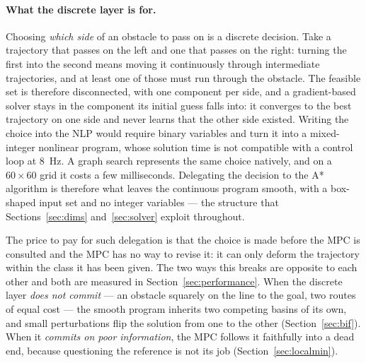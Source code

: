 \documentclass[11pt,a4paper]{article}
\begin{document}
\paragraph{What the discrete layer is for.} Choosing \emph{which side} of an obstacle to pass on is a discrete decision. Take a trajectory that passes on the left and one that passes on the right: turning the first into the second means moving it continuously through intermediate trajectories, and at least one of those must run through the obstacle. The feasible set is therefore disconnected, with one component per side, and a gradient-based solver stays in the component its initial guess falls into: it converges to the best trajectory on one side and never learns that the other side existed. Writing the choice into the NLP would require binary variables and turn it into a mixed-integer nonlinear program, whose solution time is not compatible with a control loop at 8~Hz. A graph search represents the same choice natively, and on a $60\times60$
grid it costs a few milliseconds. Delegating the decision to the A* algorithm is therefore what leaves the continuous program
smooth, with a box-shaped input set and no integer variables --- the structure that
Sections~\ref{sec:dims} and~\ref{sec:solver} exploit throughout.

The price to pay for such delegation is that the choice is made before the MPC is consulted and the MPC has no way to
revise it: it can only deform the trajectory within the class it has been given. The two ways this breaks
are opposite to each other and both are measured in Section~\ref{sec:performance}. When the discrete layer
\emph{does not commit} --- an obstacle squarely on the line to the goal, two routes of equal cost --- the
smooth program inherits two competing basins of its own, and small perturbations flip the solution from one
to the other (Section~\ref{sec:bif}). When it \emph{commits on poor information}, the MPC follows it
faithfully into a dead end, because questioning the reference is not its job
(Section~\ref{sec:localmin}).
\end{document}
